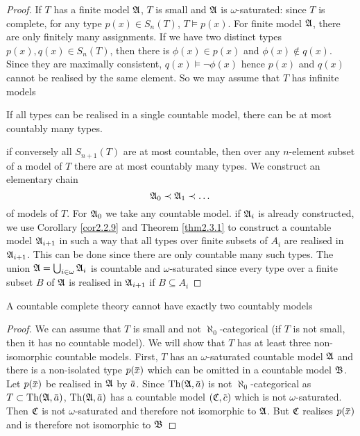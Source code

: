 \documentclass[11pt]{article}
\begin{document}
\begin{proof}
If \(T\) has a finite model \(\mathfrak{A}\), \(T\) is small and \(\mathfrak{A}\) is
\(\omega\)-saturated: since \(T\) is complete, for any type \(p(x)\in S_n(T)\), \(T\vDash p(x)\). For finite
model \(\mathfrak{A}\), there are only finitely many assignments. If we have two distinct
types \(p(x),q(x)\in S_n(T)\), then there is \(\phi(x)\in p(x)\) and \(\phi(x)\not\in q(x)\). Since they are
maximally consistent, \(q(x)\vDash\neg\phi(x)\) hence \(p(x)\) and \(q(x)\) cannot be realised by the same
element. So we may assume that \(T\) has infinite
models

If all types can be realised in a single countable model, there can be at most countably many
types.

if conversely all \(S_{n+1}(T)\) are at most countable, then over any \(n\)-element subset of a
model of \(T\) there are at most countably many types. We construct an elementary chain
\begin{equation*}
\mathfrak{A}_0\prec\mathfrak{A}_1\prec\dots
\end{equation*}
of models of \(T\). For \(\mathfrak{A}_0\) we take any countable model. if \(\mathfrak{A}_i\) is already constructed, we
use Corollary \ref{cor2.2.9} and Theorem \ref{thm2.3.1} to construct a countable model \(\mathfrak{A}_{i+1}\) in
such a way that all types over finite subsets of \(A_i\) are realised in \(\mathfrak{A}_{i+1}\). This can be
done since there are only countable many such types. The union \(\mathfrak{A}=\bigcup_{i\in\omega}\mathfrak{A}_i\) is countable
and \(\omega\)-saturated since every type over a finite subset \(B\) of \(\mathfrak{A}\) is realised
in \(\mathfrak{A}_{i+1}\) if \(B\subseteq A_i\)
\end{proof}

\begin{theorem}[Vaught]
A countable complete theory cannot have exactly two countably models
\end{theorem}

\begin{proof}
We can assume that \(T\) is small and not \(\aleph_0\)-categorical (if \(T\) is not small, then it has
no countable model). We will show that \(T\) has at
least three non-isomorphic countable models. First, \(T\) has an \(\omega\)-saturated countable
model \(\mathfrak{A}\) and there is a non-isolated type \(p(\barx)\) which can be omitted in a countable
model \(\mathfrak{B}\). Let \(p(\barx)\) be realised in \(\mathfrak{A}\) by \(\bara\). Since \(\Th(\fA,\bara)\) is
not \(\aleph_0\)-categorical as \(T\subset\Th(\fA,\bara)\), \(\Th(\fA,\bara)\) has a countable model \((\fC,\barc)\) which is not
\(\omega\)-saturated. Then \(\mathfrak{C}\) is not \(\omega\)-saturated and therefore not isomorphic to \(\mathfrak{A}\). But \(\mathfrak{C}\)
realises \(p(\barx)\) and is therefore not isomorphic to \(\mathfrak{B}\)
\end{proof}
\end{document}

